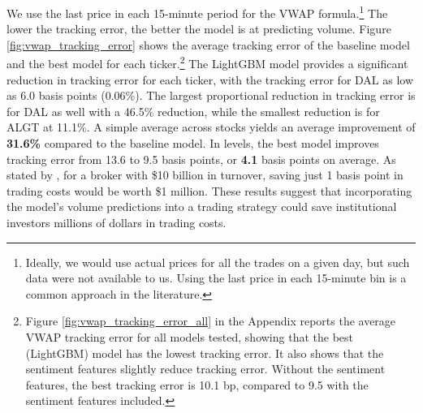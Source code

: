 \documentclass[12pt]{article}
\begin{document}
We use the last price in each 15-minute period for the VWAP formula.\footnote{Ideally, we would use actual prices for all the trades on a given day, but such data were not available to us. Using the last price in each 15-minute bin is a common approach in the literature.} The lower the tracking error, the better the model is at predicting volume. Figure \ref{fig:vwap_tracking_error} shows the average tracking error of the baseline model and the best model for each ticker.\footnote{Figure \ref{fig:vwap_tracking_error_all} in the Appendix reports the average VWAP tracking error for all models tested, showing that the best (LightGBM) model has the lowest tracking error. It also shows that the sentiment features slightly reduce tracking error. Without the sentiment features, the best tracking error is 10.1 bp, compared to 9.5 with the sentiment features included.} The LightGBM model provides a significant reduction in tracking error for each ticker, with the tracking error for DAL as low as 6.0 basis points (0.06\%). The largest proportional reduction in tracking error is for DAL as well with a 46.5\% reduction, while the smallest reduction is for ALGT at 11.1\%. A simple average across stocks yields an average improvement of \textbf{31.6\%} compared to the baseline model. In levels, the best model improves tracking error from 13.6 to 9.5 basis points, or \textbf{4.1} basis points on average. As stated by \textcite{chen2016forecasting}, for a broker with \$10 billion in turnover, saving just 1 basis point in trading costs would be worth \$1 million. These results suggest that incorporating the model's volume predictions into a trading strategy could save institutional investors millions of dollars in trading costs.
\end{document}
